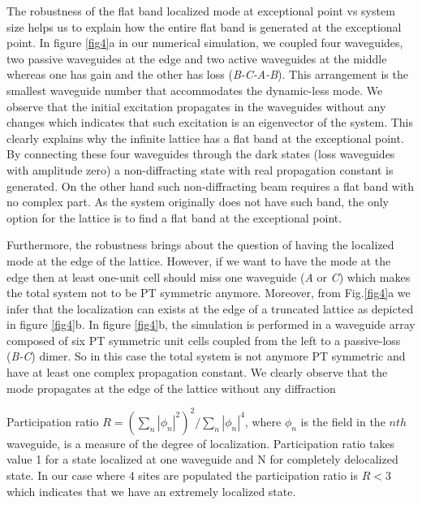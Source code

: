 \documentclass[aps,prl,twocolumn,showpacs,groupedaddress,amsmath,amssymb]{revtex4}
\begin{document}
The robustness of the flat band localized mode at exceptional point vs system size helps us to explain how the entire flat band is generated at the exceptional point. In figure \ref{fig4}a in our numerical simulation, we coupled four waveguides, two passive waveguides at the edge and two active waveguides at the middle whereas one has gain and the other has loss (\textit{B-C-A-B}). This arrangement is the smallest waveguide number that accommodates the dynamic-less mode. We observe that the initial excitation propagates in the waveguides without any changes which indicates that such excitation is an eigenvector of the system. This clearly explains why the infinite lattice has a flat band at the exceptional point. By connecting these four waveguides through the dark states (loss waveguides with amplitude zero) a non-diffracting state with real propagation constant is generated. On the other hand such non-diffracting beam requires a flat band with no complex part. As the system originally does not have such band, the only option for the lattice is to find a flat band at the exceptional point. 

Furthermore, the robustness brings about the question of having the localized mode at the edge of the lattice. However, if we want to have the mode at the edge then at least one-unit cell should miss one waveguide (\textit{A} or \textit{C}) which makes the total system not to be PT symmetric anymore. Moreover, from Fig.\ref{fig4}a we infer that the localization can exists at the edge of a truncated lattice as depicted in figure \ref{fig4}b. In figure \ref{fig4}b, the simulation is performed in a waveguide array composed of six PT symmetric unit cells coupled from the left to a passive-loss (\textit{B-C}) dimer. So in this case the total system is not anymore PT symmetric and have at least one complex propagation constant. We clearly observe that the mode propagates at the edge of the lattice without any diffraction


Participation ratio $R=(\sum_{n}|\phi_n|^2)^2/\sum_{n}|\phi_n|^4$, where $\phi_n$ is the field in the $nth$ waveguide, is a measure of the degree of localization. Participation ratio takes value 1 for a state localized at one waveguide and N for completely delocalized state. In our case where 4 sites are populated the participation ratio is $R<3$ which indicates that we have an extremely localized state.
\end{document}
